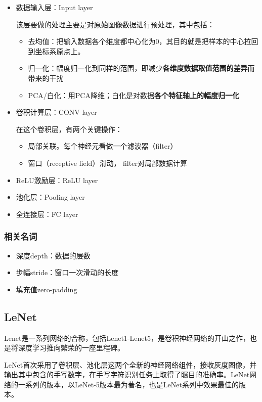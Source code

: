 \documentclass[12pt,a4paper]{article}
\begin{document}
\begin{itemize}
\item
  数据输入层：Input layer
  
  该层要做的处理主要是对原始图像数据进行预处理，其中包括：
    \begin{itemize}
    \item
      去均值：把输入数据各个维度都中心化为0，其目的就是把样本的中心拉回到坐标系原点上。
    \item
      归一化：幅度归一化到同样的范围，即减少\textbf{各维度数据取值范围的差异}而带来的干扰
    \item
      PCA/白化：用PCA降维；白化是对数据\textbf{各个特征轴上的幅度归一化}
    \end{itemize}
\item
  卷积计算层：CONV layer

  在这个卷积层，有两个关键操作：

    \begin{itemize}
    \item
      局部关联。每个神经元看做一个滤波器（filter）
    \item
      窗口（receptive field）滑动， filter对局部数据计算
    \end{itemize}
\item
  ReLU激励层：ReLU layer
\item
  池化层：Pooling layer
\item
  全连接层：FC layer
\end{itemize}

\subsubsection{相关名词}

\begin{itemize}
\item
  深度depth：数据的层数
\item
  步幅stride：窗口一次滑动的长度
\item
  填充值zero-padding
\end{itemize}

\subsection{LeNet}

Lenet是一系列网络的合称，包括Lenet1-Lenet5，是卷积神经网络的开山之作，也是将深度学习推向繁荣的一座里程碑。

LeNet首次采用了卷积层、池化层这两个全新的神经网络组件，接收灰度图像，并输出其中包含的手写数字，在手写字符识别任务上取得了瞩目的准确率。LeNet网络的一系列的版本，以LeNet-5版本最为著名，也是LeNet系列中效果最佳的版本。
\end{document}
